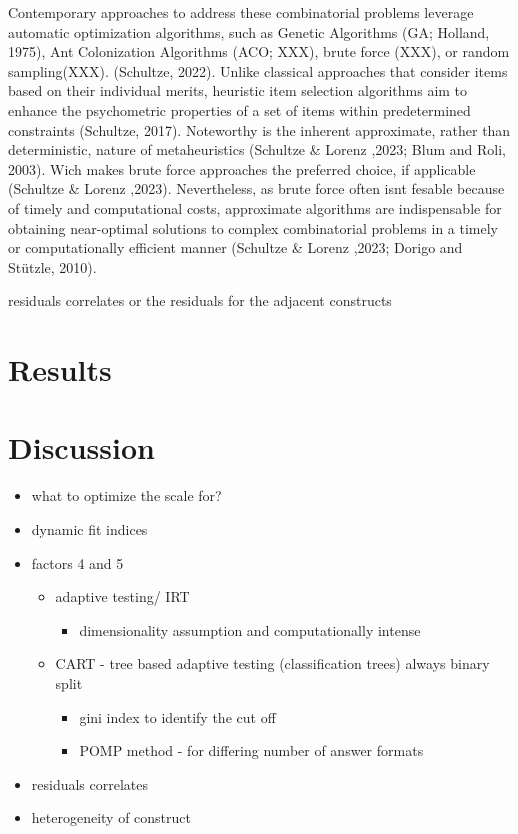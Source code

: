 \documentclass[
  12pt,
  a4paper,
  twoside]{article}
\providecommand{\tightlist}{%
  \setlength{\itemsep}{0pt}\setlength{\parskip}{0pt}}
\begin{document}
Contemporary approaches to address these combinatorial problems leverage automatic optimization algorithms, such as Genetic Algorithms (GA; Holland, 1975), Ant Colonization Algorithms (ACO; XXX), brute force (XXX), or random sampling(XXX). (Schultze, 2022).
Unlike classical approaches that consider items based on their individual merits, heuristic item selection algorithms aim to enhance the psychometric properties of a set of items within predetermined constraints (Schultze, 2017).
Noteworthy is the inherent approximate, rather than deterministic, nature of metaheuristics (Schultze \& Lorenz ,2023; Blum and Roli, 2003). Wich makes brute force approaches the preferred choice, if applicable (Schultze \& Lorenz ,2023). Nevertheless, as brute force often isnt fesable because of timely and computational costs, approximate algorithms are indispensable for obtaining near-optimal solutions to complex combinatorial problems in a timely or computationally efficient manner (Schultze \& Lorenz ,2023; Dorigo and Stützle, 2010).

residuals
correlates or the residuals for the adjacent constructs

\hypertarget{results}{%
\section{Results}\label{results}}

\hypertarget{discussion}{%
\section{Discussion}\label{discussion}}

\begin{itemize}
\tightlist
\item
  what to optimize the scale for?
\item
  dynamic fit indices
\item
  factors 4 and 5

  \begin{itemize}
  \tightlist
  \item
    adaptive testing/ IRT

    \begin{itemize}
    \tightlist
    \item
      dimensionality assumption and computationally intense
    \end{itemize}
  \item
    CART - tree based adaptive testing (classification trees) always binary split

    \begin{itemize}
    \tightlist
    \item
      gini index to identify the cut off
    \item
      POMP method - for differing number of answer formats
    \end{itemize}
  \end{itemize}
\item
  residuals correlates
\item
  heterogeneity of construct
\end{itemize}
\end{document}
